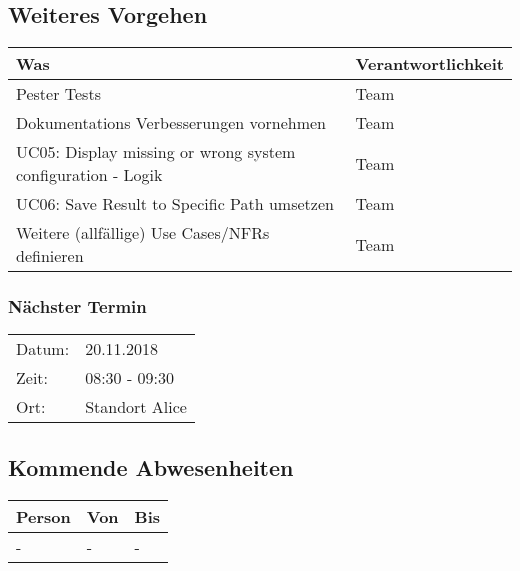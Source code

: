 \subsection*{Weiteres Vorgehen}
\begin{table}[H]
    \centering
    \begin{tabular}{p{12cm} p{4cm}}
        \textbf{Was} & \textbf{Verantwortlichkeit} \\ \hline
        Pester Tests & Team \\ \hline
        Dokumentations Verbesserungen vornehmen & Team\\ \hline
        UC05: Display missing or wrong system configuration - Logik & Team \\ \hline
        UC06: Save Result to Specific Path umsetzen & Team \\ \hline
        Weitere (allfällige) Use Cases/NFRs definieren & Team\\ \hline
    \end{tabular}
\end{table}

\clearpage

\subsubsection*{Nächster Termin}

\begin{tabular}{p{4cm} p{12cm}}
    Datum: & 20.11.2018 \\
    Zeit: & 08:30 - 09:30 \\
    Ort: & Standort Alice \\
\end{tabular}

\vspace{1cm}

\subsection*{Kommende Abwesenheiten}
\begin{table}[H]
    \centering
    \begin{tabular}{p{6cm} p{5cm} p{5cm}}
        \textbf{Person} & \textbf{Von} & \textbf{Bis} \\ \hline
        - & - & - \\ \hline
    \end{tabular}
\end{table}

\vspace{1cm}

